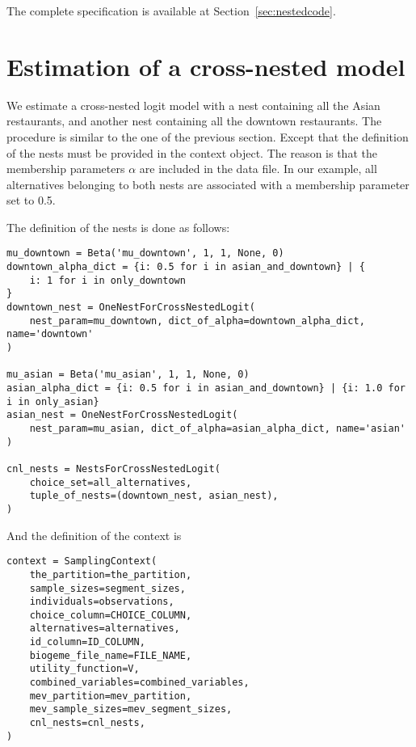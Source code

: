 \documentclass[12pt,a4paper]{article}
\begin{document}
The complete specification is available at Section~\ref{sec:nestedcode}.

\section{Estimation of a cross-nested model}
\label{sec:cnl}
We estimate a cross-nested logit model with a nest containing all the
Asian restaurants, and another nest containing all the downtown
restaurants. The procedure is similar to the one of the previous
section. Except that the definition of the nests must be provided in
the context object. The reason is that the membership parameters
$\alpha$ are included in the data file. In our example, all
alternatives belonging to both nests are associated with a membership
parameter set to 0.5.

The definition of the nests is done as follows:
\begin{lstlisting}
mu_downtown = Beta('mu_downtown', 1, 1, None, 0)
downtown_alpha_dict = {i: 0.5 for i in asian_and_downtown} | {
    i: 1 for i in only_downtown
}
downtown_nest = OneNestForCrossNestedLogit(
    nest_param=mu_downtown, dict_of_alpha=downtown_alpha_dict, name='downtown'
)

mu_asian = Beta('mu_asian', 1, 1, None, 0)
asian_alpha_dict = {i: 0.5 for i in asian_and_downtown} | {i: 1.0 for i in only_asian}
asian_nest = OneNestForCrossNestedLogit(
    nest_param=mu_asian, dict_of_alpha=asian_alpha_dict, name='asian'
)

cnl_nests = NestsForCrossNestedLogit(
    choice_set=all_alternatives,
    tuple_of_nests=(downtown_nest, asian_nest),
)
\end{lstlisting}
And the definition of the context is
\begin{lstlisting}
context = SamplingContext(
    the_partition=the_partition,
    sample_sizes=segment_sizes,
    individuals=observations,
    choice_column=CHOICE_COLUMN,
    alternatives=alternatives,
    id_column=ID_COLUMN,
    biogeme_file_name=FILE_NAME,
    utility_function=V,
    combined_variables=combined_variables,
    mev_partition=mev_partition,
    mev_sample_sizes=mev_segment_sizes,
    cnl_nests=cnl_nests,
)
\end{lstlisting}
\end{document}
